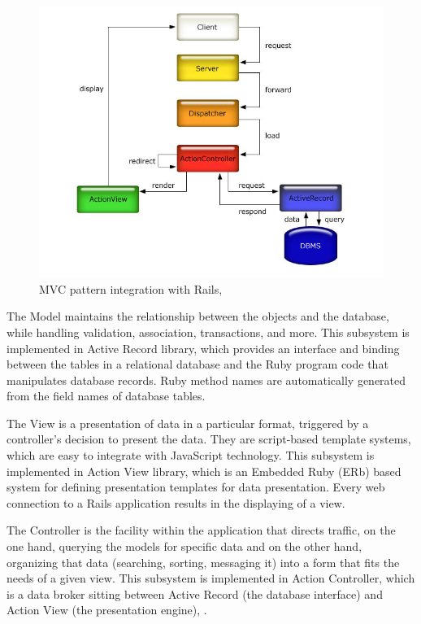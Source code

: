 \begin{figure}[H]
\centering
\includegraphics[width=12cm]{Chapter1/mvc-rails.jpg}
\caption{MVC pattern integration with Rails, \cite{mvc}}
\label{fig:MVC-Rails}
\end{figure}

The Model maintains the relationship between the objects and the database, while handling validation, association, transactions, and more. This subsystem is implemented in Active Record library, which provides an interface and binding between the tables in a relational database and the Ruby program code that manipulates database records. Ruby method names are automatically generated from the field names of database tables.

The View is a presentation of data in a particular format, triggered by a controller's decision to present the data. They are script-based template systems, which are easy to integrate with JavaScript technology. This subsystem is implemented in Action View library, which is an Embedded Ruby (ERb) based system for defining presentation templates for data presentation. Every web connection to a Rails application results in the displaying of a view.

The Controller is the facility within the application that directs traffic, on the one hand, querying the models for specific data and on the other hand, organizing that data (searching, sorting, messaging it) into a form that fits the needs of a given view. This subsystem is implemented in Action Controller, which is a data broker sitting between Active Record (the database interface) and Action View (the presentation engine), \cite{mvc2}.

